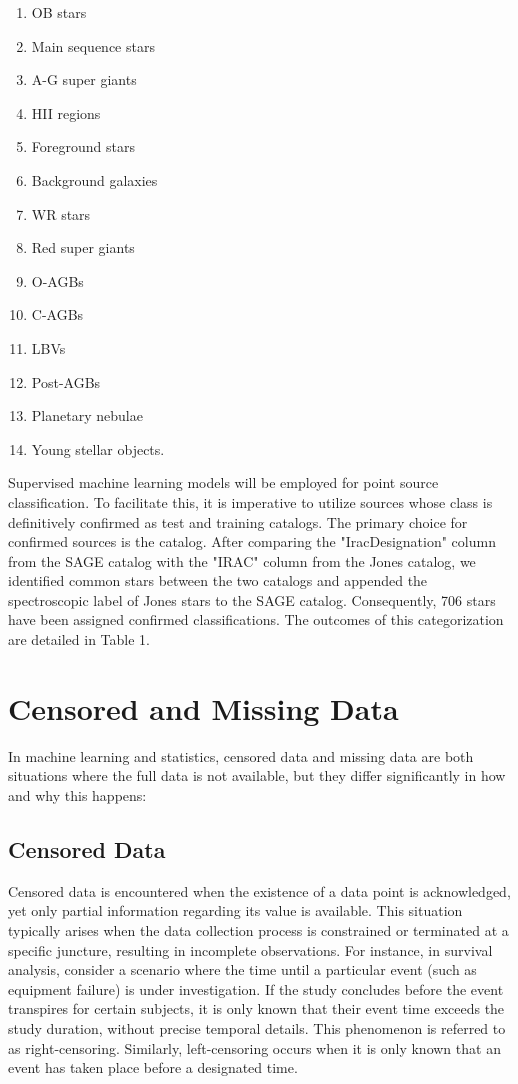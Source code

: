 \documentclass[a4paper, 15pt,usenatbib]{article}
\begin{document}
\begin{enumerate}
  \item OB stars
  \item Main sequence stars
  \item A-G super giants
  \item HII regions
  \item Foreground stars
  \item Background galaxies
  \item WR stars
  \item Red super giants
  \item O-AGBs
  \item C-AGBs
  \item LBVs
  \item Post-AGBs
  \item Planetary nebulae
  \item Young stellar objects. 
\end{enumerate}  

Supervised machine learning models will be employed for point source classification. To facilitate this, it is imperative to utilize sources whose class is definitively confirmed as test and training catalogs. The primary choice for confirmed sources is the \citet{Jones17} catalog. After comparing the "IracDesignation" column from the SAGE catalog with the "IRAC" column from the Jones catalog, we identified common stars between the two catalogs and appended the spectroscopic label of Jones stars to the SAGE catalog. Consequently, 706 stars have been assigned confirmed classifications. The outcomes of this categorization are detailed in Table 1.

\section{Censored and Missing Data}

In machine learning and statistics, censored data and missing data are both situations where the full data is not available, but they differ significantly in how and why this happens:

\subsection{Censored Data}

Censored data is encountered when the existence of a data point is acknowledged, yet only partial information regarding its value is available. This situation typically arises when the data collection process is constrained or terminated at a specific juncture, resulting in incomplete observations. For instance, in survival analysis, consider a scenario where the time until a particular event (such as equipment failure) is under investigation. If the study concludes before the event transpires for certain subjects, it is only known that their event time exceeds the study duration, without precise temporal details. This phenomenon is referred to as right-censoring. Similarly, left-censoring occurs when it is only known that an event has taken place before a designated time.
\end{document}
